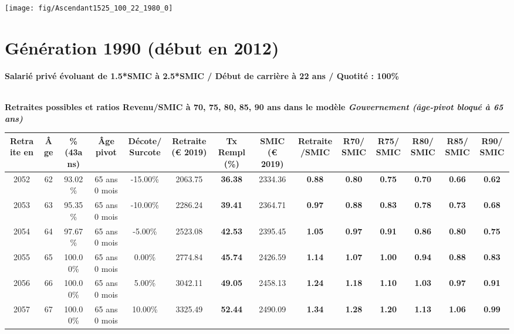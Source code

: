  {\hspace{-2.2cm}\texttt{[image: fig/Ascendant1525\_100\_22\_1980\_0]}} 

\newpage 
 
\section{Génération 1990 (début en 2012)\label{Ascendant1525_100_22_1990_0}} 
 
{\bf \noindent Salarié privé évoluant de 1.5*SMIC à 2.5*SMIC / Début de carrière à 22 ans / Quotité : 100\%}  ~ 

 ~\\{\bf \noindent Retraites possibles et ratios Revenu/SMIC à 70, 75, 80, 85, 90 ans dans le modèle \emph{Gouvernement (âge-pivot bloqué à 65 ans)}}  
 
\begin{adjustbox}{max width=\textwidth} 
\begin{tabular}[htb]{|c|c||c|c|c||c|c||c|c||c|c|c|c|c|} 
\hline 
 Retraite en &  Âge &  \%(43ans) &  Âge pivot &  Décote/Surcote &  Retraite (\euro{} 2019) &  Tx Rempl(\%) &  SMIC (\euro{} 2019) &  Retraite/SMIC &  R70/SMIC &  R75/SMIC &  R80/SMIC &  R85/SMIC &  R90/SMIC \\ 
\hline \hline 
 2052 &  62 &  93.02\% &  65 ans 0 mois &  -15.00\% &  2063.75 &  {\bf 36.38} &  2334.36 &  {\bf {\color{red} 0.88}} &  {\bf {\color{red} 0.80}} &  {\bf {\color{red} 0.75}} &  {\bf {\color{red} 0.70}} &  {\bf {\color{red} 0.66}} &  {\bf {\color{red} 0.62}} \\ 
\hline 
 2053 &  63 &  95.35\% &  65 ans 0 mois &  -10.00\% &  2286.24 &  {\bf 39.41} &  2364.71 &  {\bf {\color{red} 0.97}} &  {\bf {\color{red} 0.88}} &  {\bf {\color{red} 0.83}} &  {\bf {\color{red} 0.78}} &  {\bf {\color{red} 0.73}} &  {\bf {\color{red} 0.68}} \\ 
\hline 
 2054 &  64 &  97.67\% &  65 ans 0 mois &  -5.00\% &  2523.08 &  {\bf 42.53} &  2395.45 &  {\bf 1.05} &  {\bf {\color{red} 0.97}} &  {\bf {\color{red} 0.91}} &  {\bf {\color{red} 0.86}} &  {\bf {\color{red} 0.80}} &  {\bf {\color{red} 0.75}} \\ 
\hline 
 2055 &  65 &  100.00\% &  65 ans 0 mois &  0.00\% &  2774.84 &  {\bf 45.74} &  2426.59 &  {\bf 1.14} &  {\bf 1.07} &  {\bf 1.00} &  {\bf {\color{red} 0.94}} &  {\bf {\color{red} 0.88}} &  {\bf {\color{red} 0.83}} \\ 
\hline 
 2056 &  66 &  100.00\% &  65 ans 0 mois &  5.00\% &  3042.11 &  {\bf 49.05} &  2458.13 &  {\bf 1.24} &  {\bf 1.18} &  {\bf 1.10} &  {\bf 1.03} &  {\bf {\color{red} 0.97}} &  {\bf {\color{red} 0.91}} \\ 
\hline 
 2057 &  67 &  100.00\% &  65 ans 0 mois &  10.00\% &  3325.49 &  {\bf 52.44} &  2490.09 &  {\bf 1.34} &  {\bf 1.28} &  {\bf 1.20} &  {\bf 1.13} &  {\bf 1.06} &  {\bf {\color{red} 0.99}} \\ 
\hline 
\hline 
\end{tabular} 
\end{adjustbox} 
 
